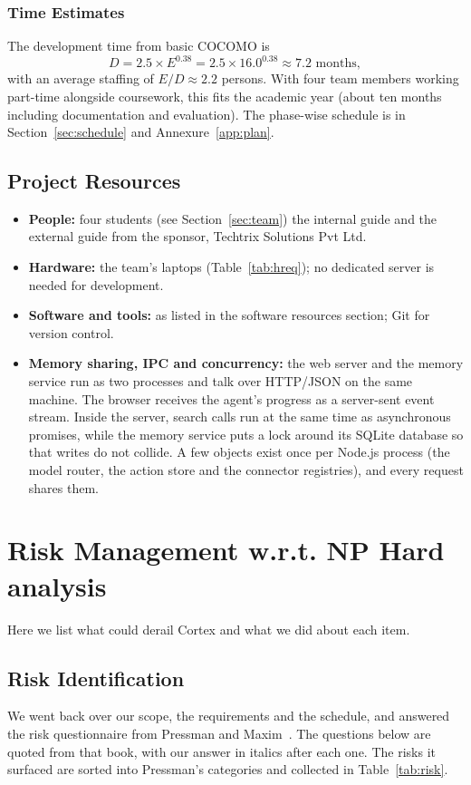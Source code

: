 \documentclass[oneside,a4paper,12pt]{report}
\begin{document}
\subsubsection{Time Estimates}
The development time from basic COCOMO is
\[ D = 2.5 \times E^{0.38} = 2.5 \times 16.0^{0.38} \approx 7.2 \mbox{ months}, \]
with an average staffing of $E/D \approx 2.2$ persons. With four team members working part-time alongside coursework, this fits the academic year (about ten months including documentation and evaluation). The phase-wise schedule is in Section~\ref{sec:schedule} and Annexure~\ref{app:plan}.


\subsection{Project Resources}
\begin{itemize}
\item \textbf{People:} four students (see Section~\ref{sec:team}) the internal guide and the external guide from the sponsor, Techtrix Solutions Pvt Ltd.
\item \textbf{Hardware:} the team's laptops (Table~\ref{tab:hreq}); no dedicated server is needed for development.
\item \textbf{Software and tools:} as listed in the software resources section; Git for version control.
\item \textbf{Memory sharing, IPC and concurrency:} the web server and the memory service run as two processes and talk over HTTP/JSON on the same machine. The browser receives the agent's progress as a server-sent event stream. Inside the server, search calls run at the same time as asynchronous promises, while the memory service puts a lock around its SQLite database so that writes do not collide. A few objects exist once per Node.js process (the model router, the action store and the connector registries), and every request shares them.
\end{itemize}

\section{Risk Management w.r.t. NP Hard analysis}
Here we list what could derail Cortex and what we did about each item.
\subsection{Risk Identification}
We went back over our scope, the requirements and the schedule, and answered the risk questionnaire from Pressman and Maxim~\cite{bookPressman}. The questions below are quoted from that book, with our answer in italics after each one. The risks it surfaced are sorted into Pressman's categories and collected in Table~\ref{tab:risk}.
\end{document}
